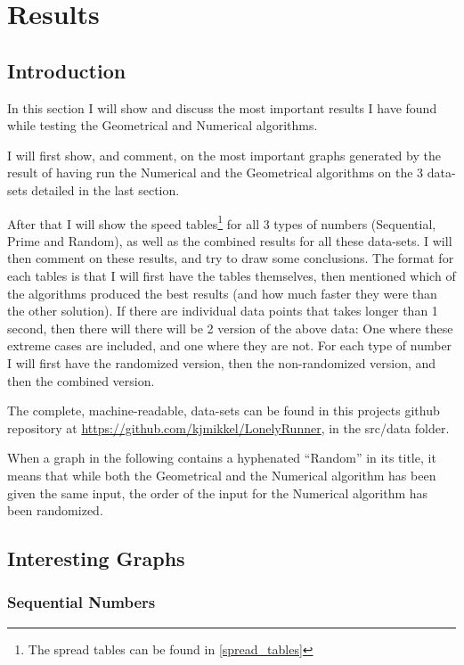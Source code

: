 \section{Results}
\label{results}
\subsection{Introduction}
In this section I will show and discuss the most important results I have found while testing the Geometrical and Numerical algorithms. 

I will first show, and comment, on the most important graphs generated by the result of having run the Numerical and the Geometrical algorithms on the 3 data-sets detailed in the last section.

After that I will show the speed tables\footnote{The spread tables can be found in \ref{spread_tables}} for all 3 types of numbers (Sequential, Prime and Random), as well as the combined results for all these data-sets. I will then comment on these results, and try to draw some conclusions. The format for each tables is that I will first have the tables themselves, then mentioned which of the algorithms produced the best results (and how much faster they were than the other solution). If there are individual data points that takes longer than 1 second, then there will there will be 2 version of the above data: One where these extreme cases are included, and one where they are not. For each type of number I will first have the randomized version, then the non-randomized version, and then the combined version.

The complete, machine-readable, data-sets can be found in this projects github repository at \underline{https://github.com/kjmikkel/LonelyRunner}, in the src/data folder.

When a graph in the following contains a hyphenated ``Random'' in its title, it means that while both the Geometrical and the Numerical algorithm has been given the same input, the order of the input for the Numerical algorithm has been randomized. 

\subsection{Interesting Graphs}

\subsubsection{Sequential Numbers}

